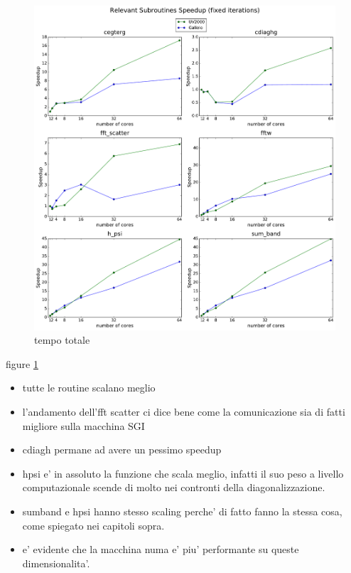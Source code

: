 \documentclass[a4paper,12pt]{article}
\begin{document}
\newpage
\begin{figure}[hhh!]
\centerline{ \includegraphics[width=1.2\linewidth]{arch_subroutines.pdf}	}
	\caption{tempo totale}
	\label{fig:archSubroutines}
\end{figure}

figure \ref{fig:archSubroutines}

\begin{itemize}
	\item tutte le routine scalano meglio
	\item l'andamento dell'fft scatter ci dice bene come la comunicazione sia di fatti migliore sulla macchina SGI
	\item cdiagh permane ad avere un pessimo speedup
	\item hpsi e' in assoluto la funzione che scala meglio, infatti il suo peso a livello computazionale scende di molto nei
	contronti della diagonalizzazione.
	\item sumband e hpsi hanno stesso scaling perche' di fatto fanno la stessa cosa, come spiegato nei capitoli sopra.
	\item e' evidente che la macchina numa e' piu' performante su queste dimensionalita'.
\end{itemize}
\end{document}
